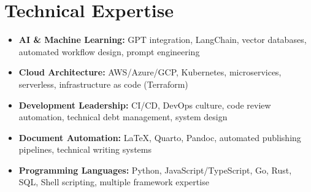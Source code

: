 
\section{Technical Expertise}
\small{
\begin{itemize}[leftmargin=0in, label={}]
  \item \textbf{AI \& Machine Learning:} GPT integration, LangChain, vector databases, automated workflow design, prompt engineering
  \item \textbf{Cloud Architecture:} AWS/Azure/GCP, Kubernetes, microservices, serverless, infrastructure as code (Terraform)
  \item \textbf{Development Leadership:} CI/CD, DevOps culture, code review automation, technical debt management, system design
  \item \textbf{Document Automation:} LaTeX, Quarto, Pandoc, automated publishing pipelines, technical writing systems
  \item \textbf{Programming Languages:} Python, JavaScript/TypeScript, Go, Rust, SQL, Shell scripting, multiple framework expertise
\end{itemize}
}